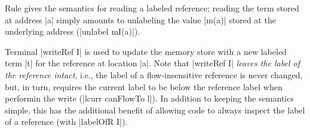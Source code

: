 Rule  gives the semantics for reading a
labeled reference; reading the term stored at address |a| simply
amounts to unlabeling the value |m(a)| stored at the underlying
address (|unlabel mI(a)|).
 
Terminal |writeRef I| is used to update the memory store with a new labeled term
|t| for the reference at location |a|.
%
Note that |writeRef I| \emph{leaves the label of the reference
intact}, i.e., the label of a flow-insensitive reference is never
changed, but, in turn, requires the current label to be below the
reference label when performin the write (|lcurr canFlowTo l|).
%
In addition to keeping the semantics simple, this has the additional
benefit of allowing code to always inspect the label of a reference
(with |labelOfR I|).
%




